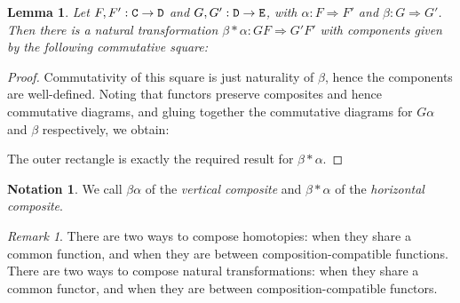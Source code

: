 \documentclass[11 pt]{amsart}
\theoremstyle{plain}   %
\newtheorem{lemma}{Lemma}[section]
\theoremstyle{definition}
\newtheorem{notn}{Notation}[section]
\theoremstyle{remark}
\newtheorem{rem}{Remark}[section]
\numberwithin{equation}{section}
\def\nat{\Rightarrow}
\newcommand{\punctuation}[1]{\makebox[0pt][l]{#1}}
\newcommand{\cat}[1]{{\normalfont\texttt{#1}}}
\begin{document}
\begin{lemma}\label{horizontal composition}
	Let $F,F': \cat{C}\rightarrow\cat{D}$ and $G,G': \cat{D}\rightarrow\cat{E}$,
	with $\alpha: F\nat F'$ and $\beta: G\nat G'$. Then there is a natural
	transformation $\beta*\alpha: GF\nat G'F'$ with components given by the
	following commutative square:
	\begin{figure}[H]
		\centering
	\end{figure}
\end{lemma}

\begin{proof}
	Commutativity of this square is just naturality of $\beta$, hence the
	components are well-defined. Noting that functors preserve composites and
	hence commutative diagrams, and gluing together the commutative diagrams for
	$G\alpha$ and $\beta$ respectively, we obtain:
	\begin{figure}[H]
		\centering
	\end{figure}
	The outer rectangle is exactly the required result for $\beta*\alpha$.
\end{proof}

\begin{notn}
	We call $\beta\alpha$ of  the \emph{vertical
		composite} and $\beta*\alpha$ of  the
	\emph{horizontal composite}.
\end{notn}

\begin{rem}\label{two compositions}
	There are two ways to compose homotopies: when they share a common function,
	and when they are between composition-compatible functions. There are two ways
	to compose natural transformations: when they share a common functor, and when
	they are between composition-compatible functors.
\end{rem}
\end{document}
